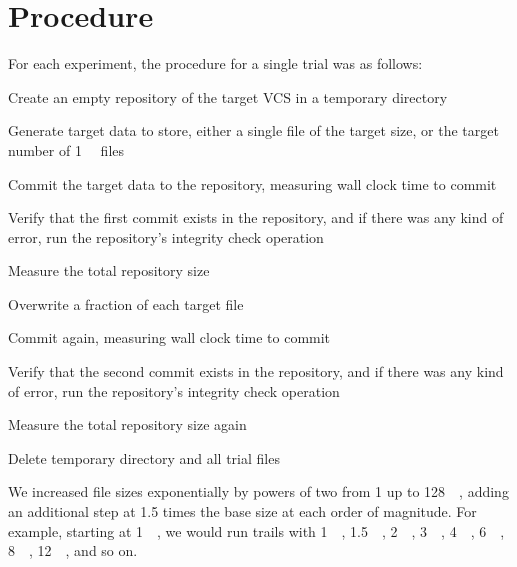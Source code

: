 \section{Procedure}

For each experiment, the procedure for a single trial was as follows:

\begin{tight_enumerate}

    \item Create an empty repository of the target VCS in a temporary directory

    \item Generate target data to store, either a single file of the target
        size, or the target number of \SI{1}{\kibi\byte} files

    \item Commit the target data to the repository, measuring wall clock time to
        commit

    \item Verify that the first commit exists in the repository, and if there
        was any kind of error, run the repository's integrity check operation

    \item Measure the total repository size

    \item Overwrite a fraction of each target file

    \item Commit again, measuring wall clock time to commit

    \item Verify that the second commit exists in the repository, and if there
        was any kind of error, run the repository's integrity check operation

    \item Measure the total repository size again

    \item Delete temporary directory and all trial files

\end{tight_enumerate}

We increased file sizes exponentially by powers of two from \SI{1}{\byte} up to
\SI{128}{\gibi\byte}, adding an additional step at \num{1.5} times the base size
at each order of magnitude. For example, starting at \SI{1}{\mebi\byte}, we
would run trails with \SI{1}{\mebi\byte}, \SI{1.5}{\mebi\byte},
\SI{2}{\mebi\byte}, \SI{3}{\mebi\byte}, \SI{4}{\mebi\byte}, \SI{6}{\mebi\byte},
\SI{8}{\mebi\byte}, \SI{12}{\mebi\byte}, and so on.

